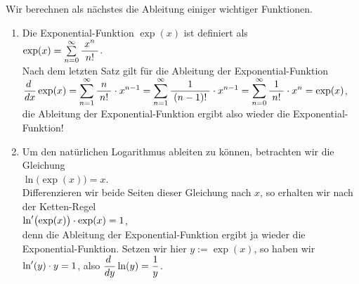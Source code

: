 \examples
Wir berechnen als n\"achstes die Ableitung einiger wichtiger Funktionen.  
\begin{enumerate}
\item Die Exponential-Funktion $\exp(x)$ ist definiert als 
      \\[0.3cm]
      \hspace*{1.3cm}
      $\exp(x) = \sum\limits_{n=0}^\infty \displaystyle\frac{\;\displaystyle x^n\;}{\;\displaystyle n!\;}$.
      \\[0.3cm]
      Nach dem letzten Satz gilt f\"ur die Ableitung der Exponential-Funktion 
      \\[0.3cm]
      \hspace*{1.3cm}
      $\displaystyle
         \frac{d\;}{dx}\exp(x) = \sum\limits_{n=1}^\infty \displaystyle\frac{\;\displaystyle n\;}{\;\displaystyle n!\;} \cdot x^{n-1}
                             = \sum\limits_{n=1}^\infty \displaystyle\frac{\;\displaystyle1\;}{\;\displaystyle(n-1)!\;} \cdot x^{n-1}
                             = \sum\limits_{n=0}^\infty \displaystyle\frac{\;\displaystyle1\;}{\;\displaystyle n!\;} \cdot x^{n} = \exp(x)$,
      \\[0.3cm]
      die Ableitung der Exponential-Funktion ergibt also wieder die Exponential-Funktion!
\item Um den nat\"urlichen Logarithmus ableiten zu k\"onnen, betrachten wir die Gleichung 
      \\[0.3cm]
      \hspace*{1.3cm}
      $\ln\bigl(\exp(x)\bigr) = x$.
      \\[0.3cm]
      Differenzieren wir beide Seiten dieser Gleichung nach $x$, so erhalten wir nach der Ketten-Regel
      \\[0.3cm]
      \hspace*{1.3cm}
      $\displaystyle\ln'\bigl(\exp(x)\bigr)\cdot \exp(x) = 1$,
      \\[0.3cm]
      denn die Ableitung der Exponential-Funktion ergibt ja wieder die
      Exponential-Funktion.  Setzen wir hier $y:= \exp(x)$, so haben wir 
      \\[0.3cm]
      \hspace*{1.3cm}
      $\displaystyle\ln'(y) \cdot y = 1$, \quad also \quad
      $\displaystyle\frac{d\;}{dy}\ln(y) = \frac{1}{y}$.


\end{enumerate}
